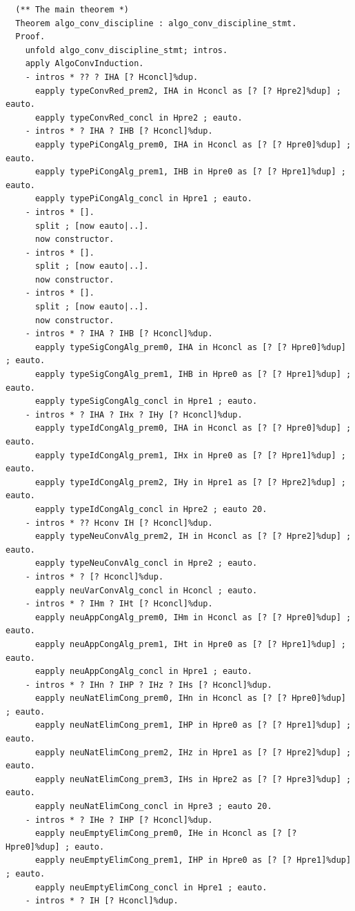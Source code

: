 \documentclass[10pt,a4paper]{amsart}
\begin{document}
\begin{lstlisting}
  (** The main theorem *)
  Theorem algo_conv_discipline : algo_conv_discipline_stmt.
  Proof.
    unfold algo_conv_discipline_stmt; intros.
    apply AlgoConvInduction.
    - intros * ?? ? IHA [? Hconcl]%dup.
      eapply typeConvRed_prem2, IHA in Hconcl as [? [? Hpre2]%dup] ; eauto.
      eapply typeConvRed_concl in Hpre2 ; eauto.
    - intros * ? IHA ? IHB [? Hconcl]%dup.
      eapply typePiCongAlg_prem0, IHA in Hconcl as [? [? Hpre0]%dup] ; eauto.
      eapply typePiCongAlg_prem1, IHB in Hpre0 as [? [? Hpre1]%dup] ; eauto.
      eapply typePiCongAlg_concl in Hpre1 ; eauto.
    - intros * [].
      split ; [now eauto|..].
      now constructor.
    - intros * [].
      split ; [now eauto|..].
      now constructor.
    - intros * [].
      split ; [now eauto|..].
      now constructor.
    - intros * ? IHA ? IHB [? Hconcl]%dup.
      eapply typeSigCongAlg_prem0, IHA in Hconcl as [? [? Hpre0]%dup] ; eauto.
      eapply typeSigCongAlg_prem1, IHB in Hpre0 as [? [? Hpre1]%dup] ; eauto.
      eapply typeSigCongAlg_concl in Hpre1 ; eauto.
    - intros * ? IHA ? IHx ? IHy [? Hconcl]%dup.
      eapply typeIdCongAlg_prem0, IHA in Hconcl as [? [? Hpre0]%dup] ; eauto.
      eapply typeIdCongAlg_prem1, IHx in Hpre0 as [? [? Hpre1]%dup] ; eauto.
      eapply typeIdCongAlg_prem2, IHy in Hpre1 as [? [? Hpre2]%dup] ; eauto.
      eapply typeIdCongAlg_concl in Hpre2 ; eauto 20.
    - intros * ?? Hconv IH [? Hconcl]%dup.
      eapply typeNeuConvAlg_prem2, IH in Hconcl as [? [? Hpre2]%dup] ; eauto.
      eapply typeNeuConvAlg_concl in Hpre2 ; eauto.
    - intros * ? [? Hconcl]%dup.
      eapply neuVarConvAlg_concl in Hconcl ; eauto.
    - intros * ? IHm ? IHt [? Hconcl]%dup.
      eapply neuAppCongAlg_prem0, IHm in Hconcl as [? [? Hpre0]%dup] ; eauto.
      eapply neuAppCongAlg_prem1, IHt in Hpre0 as [? [? Hpre1]%dup] ; eauto.
      eapply neuAppCongAlg_concl in Hpre1 ; eauto.
    - intros * ? IHn ? IHP ? IHz ? IHs [? Hconcl]%dup.
      eapply neuNatElimCong_prem0, IHn in Hconcl as [? [? Hpre0]%dup] ; eauto.
      eapply neuNatElimCong_prem1, IHP in Hpre0 as [? [? Hpre1]%dup] ; eauto.
      eapply neuNatElimCong_prem2, IHz in Hpre1 as [? [? Hpre2]%dup] ; eauto.
      eapply neuNatElimCong_prem3, IHs in Hpre2 as [? [? Hpre3]%dup] ; eauto.
      eapply neuNatElimCong_concl in Hpre3 ; eauto 20.
    - intros * ? IHe ? IHP [? Hconcl]%dup.
      eapply neuEmptyElimCong_prem0, IHe in Hconcl as [? [? Hpre0]%dup] ; eauto.
      eapply neuEmptyElimCong_prem1, IHP in Hpre0 as [? [? Hpre1]%dup] ; eauto.
      eapply neuEmptyElimCong_concl in Hpre1 ; eauto.
    - intros * ? IH [? Hconcl]%dup.

\end{lstlisting}
\end{document}
